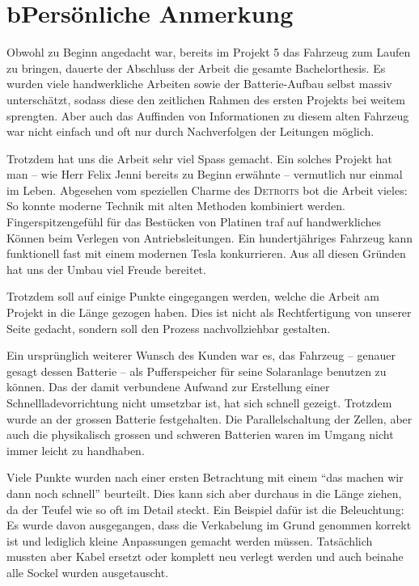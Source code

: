 \chapter*{b\quad Persönliche Anmerkung}
Obwohl zu Beginn angedacht war, bereits im Projekt 5 das Fahrzeug zum Laufen zu bringen, dauerte der Abschluss der Arbeit die gesamte Bachelorthesis. Es wurden viele handwerkliche Arbeiten sowie der Batterie-Aufbau selbst massiv unterschätzt, sodass diese den zeitlichen Rahmen des ersten Projekts bei weitem sprengten. Aber auch das Auffinden von Informationen zu diesem alten Fahrzeug war nicht einfach und oft nur durch Nachverfolgen der Leitungen möglich.

Trotzdem hat uns die Arbeit sehr viel Spass gemacht. Ein solches Projekt hat man -- wie Herr Felix Jenni bereits zu Beginn erwähnte -- vermutlich nur einmal im Leben. Abgesehen vom speziellen Charme des \textsc{Detroits} bot die Arbeit vieles: So konnte moderne Technik mit alten Methoden kombiniert werden. Fingerspitzengefühl für das Bestücken von Platinen traf auf handwerkliches Können beim Verlegen von Antriebsleitungen. Ein hundertjähriges Fahrzeug kann funktionell fast mit einem modernen Tesla konkurrieren. Aus all diesen Gründen hat uns der Umbau viel Freude bereitet.

Trotzdem soll auf einige Punkte eingegangen werden, welche die Arbeit am Projekt in die Länge gezogen haben. Dies ist nicht als Rechtfertigung von unserer Seite gedacht, sondern soll den Prozess nachvollziehbar gestalten.

Ein ursprünglich weiterer Wunsch des Kunden war es, das Fahrzeug -- genauer gesagt dessen Batterie -- als Pufferspeicher für seine Solaranlage benutzen zu können. Das der damit verbundene Aufwand zur Erstellung einer Schnellladevorrichtung nicht umsetzbar ist, hat sich schnell gezeigt. Trotzdem wurde an der grossen Batterie festgehalten. Die Parallelschaltung der Zellen, aber auch die physikalisch grossen und schweren Batterien waren im Umgang nicht immer leicht zu handhaben.

Viele Punkte wurden nach einer ersten Betrachtung mit einem "`das machen wir dann noch schnell"' beurteilt. Dies kann sich aber durchaus in die Länge ziehen, da der Teufel wie so oft im Detail steckt. Ein Beispiel dafür ist die Beleuchtung: Es wurde davon ausgegangen, dass die Verkabelung im Grund genommen korrekt ist und lediglich kleine Anpassungen gemacht werden müssen. Tatsächlich mussten aber Kabel ersetzt oder komplett neu verlegt werden und auch beinahe alle Sockel wurden ausgetauscht.

